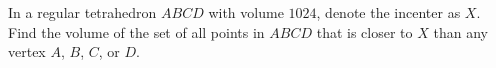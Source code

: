 In a regular tetrahedron $ABCD$ with volume $1024$, denote the incenter as $X$. Find the volume of the set of all points in $ABCD$ that is closer to $X$ than any vertex $A$, $B$, $C$, or $D$.
